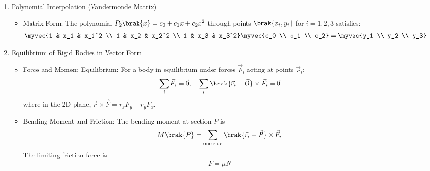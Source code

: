 \begin{enumerate}[label=\thesubsection.\arabic*, ref=\thesubsection.\theenumi,itemsep=0pt]
\item Polynomial Interpolation (Vandermonde Matrix)
\begin{itemize}
\item Matrix Form:
The polynomial $P_2\brak{x} = c_0 + c_1 x + c_2 x^2$ through points $\brak{x_i, y_i}$ for $i=1,2,3$ satisfies:
\begin{align}
\myvec{1 & x_1 & x_1^2 \\ 1 & x_2 & x_2^2 \\ 1 & x_3 & x_3^2} \myvec{c_0 \\ c_1 \\ c_2} = \myvec{y_1 \\ y_2 \\ y_3}
\label{eq:vander} %
\end{align}
\end{itemize}

\item Equilibrium of Rigid Bodies in Vector Form
\begin{itemize}
\item Force and Moment Equilibrium:
For a body in equilibrium under forces $\vec{F}_i$ acting at points $\vec{r}_i$:
\begin{align}
\sum_i \vec{F}_i = \vec{0}, \quad \sum_i \brak{\vec{r}_i - \vec{O}} \times \vec{F}_i = \vec{0}
\label{eq:equil} %
\end{align}
where in the 2D plane, $\vec{r} \times \vec{F} = r_x F_y - r_y F_x$.
\item Bending Moment and Friction:
The bending moment at section $P$ is
\begin{align} %
M\brak{P} = \sum_{\text{one side}} \brak{\vec{r}_i - \vec{P}} \times \vec{F}_i
\label{eq:bm} %
\end{align}
The limiting friction force is
\begin{align}
F = \mu N
\label{eq:fric}
\end{align}
\end{itemize}


\end{enumerate}

